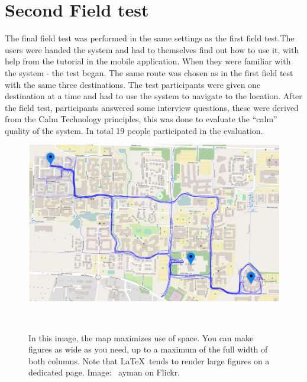 \documentclass{sigchi}
\begin{document}
\section{Second Field test}
The final field test was performed in the same settings as the first field test.The users were handed the system and had to themselves find out how to use it, with help from the tutorial in the mobile application. When they were familiar with the system - the test began. The same route was chosen as in the first field test with the same three destinations. 
\newline
\newline
The test participants were given one destination at a time and had to use the system to navigate to the location. After the field test, participants answered some interview questions, these were derived from the Calm Technology principles, this was done to evaluate the “calm” quality of the system. In total 19 people participated in the evaluation.
\begin{figure}
  \centering
  \includegraphics[width=1.20\columnwidth]{figures/stort_heat_map.png}
  \caption{In this image, the map maximizes use of space. You can make
    figures as wide as you need, up to a maximum of the full width of
    both columns. Note that \LaTeX\ tends to render large figures on a
    dedicated page. Image: \ccbynd~ayman on
    Flickr.}~\label{fig:figure2}
\end{figure}
\end{document}

